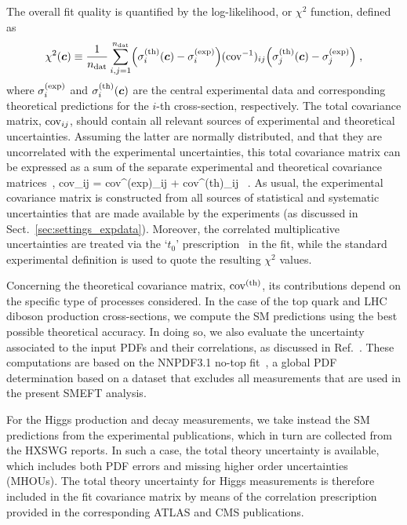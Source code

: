 The overall fit quality is quantified by the log-likelihood, 
or $\chi^2$ function, defined as
\begin{equation}
  \chi^2\lp {\boldsymbol c} \rp \equiv \frac{1}{n_{\rm dat}}\sum_{i,j=1}^{n_{\rm dat}}\lp 
  \sigma^{(\rm th)}_i\lp {\boldsymbol c} \rp
  -\sigma^{(\rm exp)}_i\rp ({\rm cov}^{-1})_{ij}
\lp 
  \sigma^{(\rm th)}_j\lp {\boldsymbol c}\rp
  -\sigma^{(\rm exp)}_j\rp
 \label{eq:chi2definition2}
    \; ,
\end{equation}
where $\sigma_i^{\rm (exp)}$ and
$\sigma^{(\rm th)}_i\lp {\boldsymbol c}\rp$ are the
central experimental data and corresponding theoretical
predictions for the $i$-th cross-section, respectively.
%
The total covariance 
matrix, ${\rm cov}_{ij}$, should contain all relevant sources of
experimental and theoretical uncertainties.
%
Assuming the latter are normally
distributed, and that they are uncorrelated
with the experimental uncertainties,
this total covariance matrix can be expressed as
a sum of the separate experimental and theoretical covariance 
matrices~\cite{AbdulKhalek:2019ihb,AbdulKhalek:2019bux},
\be
\label{eq:covmatsplitting}
{\rm cov}_{ij} = {\rm cov}^{(\rm exp)}_{ij} + {\rm cov}^{(\rm th)}_{ij} \, .
\ee
%
As usual, the experimental covariance matrix is constructed from all
sources of statistical and systematic uncertainties that are
made available by the experiments (as discussed
in Sect.~\ref{sec:settings_expdata}).
%
Moreover, the correlated multiplicative uncertainties are treated
via the `$t_0$' prescription~\cite{Ball:2009qv} in the fit, while the standard
experimental definition is used to quote the resulting $\chi^2$ values.

Concerning the theoretical covariance matrix, ${\rm cov}^{(\rm th)}$, its contributions depend
on the specific type of processes considered.
%
In the case of the top quark and LHC diboson production cross-sections,
we compute the SM predictions using the best possible
theoretical accuracy.
%
In doing so, we also evaluate the uncertainty associated
to the input PDFs and their correlations, as discussed in Ref.~\cite{Hartland:2019bjb}.
%
These computations are based on the NNPDF3.1 no-top fit~\cite{Ball:2017nwa}, a global
PDF determination based on a dataset that excludes
all measurements that are used in the present SMEFT analysis.

For the Higgs production
and decay measurements,
we take instead the SM predictions from the experimental publications,
which in turn are collected from the HXSWG reports.
%
In such a case, the total theory uncertainty is available, which includes both
PDF errors and missing higher order uncertainties (MHOUs).
%
The total theory uncertainty for Higgs measurements is therefore
included in the fit covariance matrix by means
of the correlation prescription provided in the corresponding ATLAS and CMS
publications.

